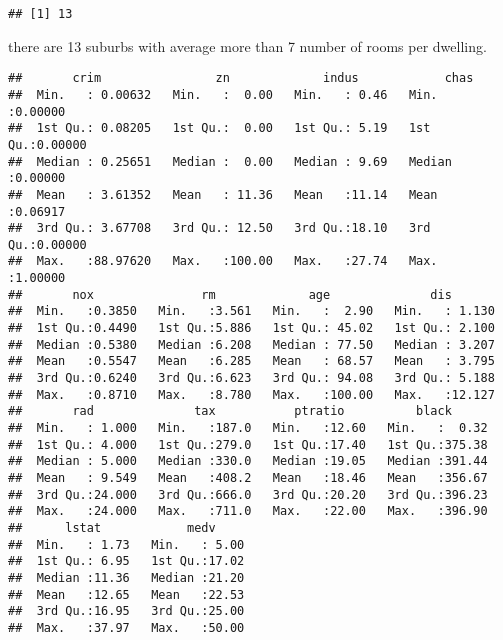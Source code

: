 \documentclass[
]{article}
\begin{document}
\begin{verbatim}
## [1] 13
\end{verbatim}

there are 13 suburbs with average more than 7 number of rooms per
dwelling.

\begin{verbatim}
##       crim                zn             indus            chas        
##  Min.   : 0.00632   Min.   :  0.00   Min.   : 0.46   Min.   :0.00000  
##  1st Qu.: 0.08205   1st Qu.:  0.00   1st Qu.: 5.19   1st Qu.:0.00000  
##  Median : 0.25651   Median :  0.00   Median : 9.69   Median :0.00000  
##  Mean   : 3.61352   Mean   : 11.36   Mean   :11.14   Mean   :0.06917  
##  3rd Qu.: 3.67708   3rd Qu.: 12.50   3rd Qu.:18.10   3rd Qu.:0.00000  
##  Max.   :88.97620   Max.   :100.00   Max.   :27.74   Max.   :1.00000  
##       nox               rm             age              dis        
##  Min.   :0.3850   Min.   :3.561   Min.   :  2.90   Min.   : 1.130  
##  1st Qu.:0.4490   1st Qu.:5.886   1st Qu.: 45.02   1st Qu.: 2.100  
##  Median :0.5380   Median :6.208   Median : 77.50   Median : 3.207  
##  Mean   :0.5547   Mean   :6.285   Mean   : 68.57   Mean   : 3.795  
##  3rd Qu.:0.6240   3rd Qu.:6.623   3rd Qu.: 94.08   3rd Qu.: 5.188  
##  Max.   :0.8710   Max.   :8.780   Max.   :100.00   Max.   :12.127  
##       rad              tax           ptratio          black       
##  Min.   : 1.000   Min.   :187.0   Min.   :12.60   Min.   :  0.32  
##  1st Qu.: 4.000   1st Qu.:279.0   1st Qu.:17.40   1st Qu.:375.38  
##  Median : 5.000   Median :330.0   Median :19.05   Median :391.44  
##  Mean   : 9.549   Mean   :408.2   Mean   :18.46   Mean   :356.67  
##  3rd Qu.:24.000   3rd Qu.:666.0   3rd Qu.:20.20   3rd Qu.:396.23  
##  Max.   :24.000   Max.   :711.0   Max.   :22.00   Max.   :396.90  
##      lstat            medv      
##  Min.   : 1.73   Min.   : 5.00  
##  1st Qu.: 6.95   1st Qu.:17.02  
##  Median :11.36   Median :21.20  
##  Mean   :12.65   Mean   :22.53  
##  3rd Qu.:16.95   3rd Qu.:25.00  
##  Max.   :37.97   Max.   :50.00
\end{verbatim}
\end{document}

